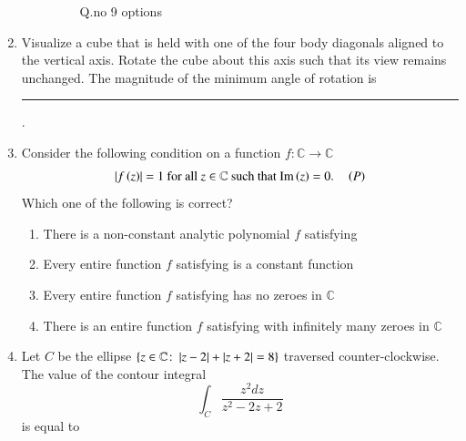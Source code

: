 \documentclass[journal,12pt,onecolumn]{IEEEtran}
\theoremstyle{remark}
\begin{document}
\begin{enumerate}
\begin{enumerate}
\begin{multicols}{2}
\begin{figure}[H]
    \caption*{Q.no 9 options}
    \label{fig:q9options}
    \end{figure}
    \end{multicols}
\end{enumerate}
\item Visualize a cube that is held with one of the four body diagonals aligned to the vertical axis. Rotate the cube about this axis such that its view remains unchanged. The magnitude of the minimum angle of rotation is \rule{3cm}{0.15mm}. \hfill{}
\begin{enumerate}
\end{enumerate}

\item Consider the following condition on a function $f \colon \mathbb{C} \to \mathbb{C}$
\[ \left\vert f\left(z\right)\right\vert = 1 \text{ for all } z \in \mathbb{C} \text{ such that } \text{Im}\left(z\right) = 0. \quad \left(P\right) \]
Which one of the following is correct? \hfill{}
\begin{enumerate}
    \item There is a non-constant analytic polynomial $f$ satisfying 
    \item Every entire function $f$ satisfying  is a constant function
    \item Every entire function $f$ satisfying  has no zeroes in $\mathbb{C}$
    \item There is an entire function $f$ satisfying  with infinitely many zeroes in $\mathbb{C}$
\end{enumerate}

\item Let $C$ be the ellipse $\{z \in \mathbb{C} \colon \left\vert z - 2\right\vert + \left\vert z + 2\right\vert = 8\}$ traversed counter-clockwise. The value of the contour integral
\[ \int_C \frac{z^2 dz}{z^2 - 2z + 2} \]
is equal to \hfill{}
\begin{enumerate}
\end{enumerate}


\end{enumerate}
\end{document}
